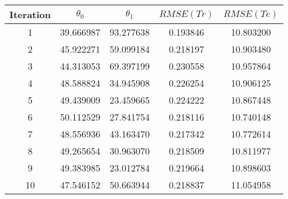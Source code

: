 \begin{tabular}{ccccc}
\toprule
 Iteration &  $\theta_0$ &  $\theta_1$ &  $RMSE(Tr)$ &  $RMSE(Te)$ \\
\midrule
         1 &   39.666987 &   93.277638 &    0.193846 &   10.803200 \\
         2 &   45.922271 &   59.099184 &    0.218197 &   10.903480 \\
         3 &   44.313053 &   69.397199 &    0.230558 &   10.957864 \\
         4 &   48.588824 &   34.945908 &    0.226254 &   10.906125 \\
         5 &   49.439009 &   23.459665 &    0.224222 &   10.867448 \\
         6 &   50.112529 &   27.841754 &    0.218116 &   10.740148 \\
         7 &   48.556936 &   43.163470 &    0.217342 &   10.772614 \\
         8 &   49.265654 &   30.963070 &    0.218509 &   10.811977 \\
         9 &   49.383985 &   23.012784 &    0.219664 &   10.898603 \\
        10 &   47.546152 &   50.663944 &    0.218837 &   11.054958 \\
\bottomrule
\end{tabular}
